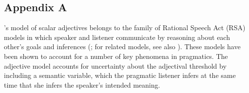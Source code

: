 

\subsection{Appendix A} \label{app:model}

 's model of scalar adjectives belongs to the family of Rational Speech Act (RSA) models in which speaker and listener communicate by  reasoning about each other's goals and inferences (; for related models, see also ). 
 These models have been shown to account for a number of key phenomena in pragmatics. The adjective model accounts for uncertainty about the adjectival threshold by including a semantic variable, which the pragmatic listener infers at the same time that she infers the speaker's intended meaning. 

